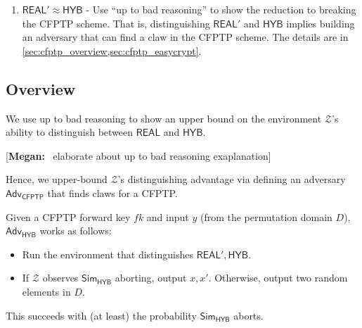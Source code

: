 \documentclass{article}[12pt]
\newcommand{\authnote}[2]{[{\color{red}\textbf{#1:}}~{\color{blue} #2}]}
\newcommand{\authnote}[2]{}
\newcommand{\megan}[1]{\authnote{Megan}{#1}}
\newcommand{\code}[1]{\texttt{#1}} %
\newcommand{\OpenMsg}{\mathsf{Open}}
\newcommand{\PKE}{\mathsf{PKE}}
\newcommand{\Dec}{\mathsf{Dec}}
\newcommand{\CFPTP}{\mathsf{CFPTP}}
\newcommand{\Back}{\mathsf{Back}}
\newcommand{\ForwKey}{{fk}}
\newcommand{\Domain}{D}
\newcommand{\Simulator}{{\mathsf{Sim}}} %
\newcommand{\Adversary}{{\mathsf{Adv}}} %
\newcommand{\Environment}{{\mathcal{Z}}} %
\newcommand{\CFPTPAdversary}{{\Adversary_\CFPTP}}
\newcommand{\Hyb}{{\mathsf{HYB}}}
\newcommand{\Real}{{\mathsf{REAL}}}
\begin{document}
\begin{enumerate}
	Also, note that we move the CRS generation step to be at the beginning of $\Real'$, so the committer can access it. This shift doesn't affect $\Real'$'s output, since the CRS is still sampled the same way using the CFPTP and PKE key generation algorithms. \megan{This can be a separate hybrid step, or keep it as part of $\Real'$.}

	$\Real'$'s executions works as follows: when the committer learns that it's corrupted, it does what $\Hyb$'s simulator does with $(y, c_0, c_1)$, using $\CFPTP.\Back_0, \CFPTP.\Back_1$ and $\PKE.\Dec$ to figure out what $b$ is. The simulator stores this $b$, but does nothing else with it. When the verifier is given $(b', x, r)$, it does the verification step like $\Real$ does.

	If the verifier accepts but $b'$ is not equal to the $b$ that the committer saved, then the verifier sets \code{REAL'.bad} to true. This corresponds with the simulator in $\Hyb$ setting \code{HYB.bad} to true and aborting.

	Note that in $\Real'$, the $\OpenMsg$ message is still sent to \code{pt2} as usual. This is crucial for retaining the program equivalence of $\Real$ and $\Real'$.

	\item\label{hyb:1.2} $\Real' \approx \Hyb$ - Use ``up to bad reasoning'' to show the reduction to breaking the CFPTP scheme. That is, distinguishing $\Real'$ and $\Hyb$ implies building an adversary that can find a claw in the CFPTP scheme. The details are in \cref{sec:cfptp_overview,sec:cfptp_easycrypt}.

\end{enumerate}

\subsection{Overview}\label{sec:cfptp_overview}
We use up to bad reasoning to show an upper bound on the environment $\Environment$'s ability to distinguish between $\Real$ and $\Hyb$.

\megan{elaborate about up to bad reasoning exaplanation}

Hence, we upper-bound $\Environment$'s distinguishing advantage via defining an adversary $\CFPTPAdversary$ that finds claws for a CFPTP.

Given a CFPTP forward key $\ForwKey$ and input $y$ (from the permutation domain $\Domain$), $\Adversary_{\Hyb}$ works as follows:
\begin{itemize}
	\item Run the environment that distinguishes $\Real', \Hyb$.
	\item If $\Environment$ observes $\Simulator_\Hyb$ aborting, output $x, x'$. Otherwise, output two random elements in $\Domain$.
\end{itemize}
This succeeds with (at least) the probability $\Simulator_\Hyb$ aborts.
\end{document}
